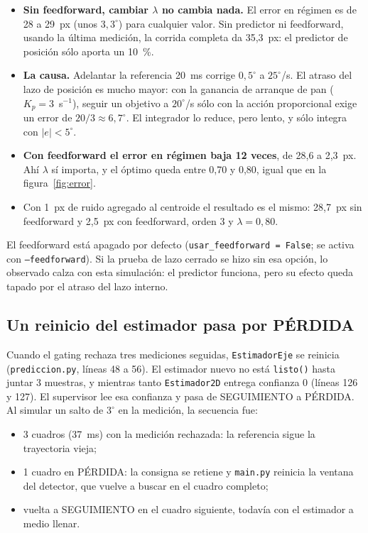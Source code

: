 \documentclass[11pt,a4paper]{article}
\newcommand{\cod}[1]{\texttt{#1}}
\newcommand{\lam}{\lambda}
\newcommand{\gr}{^{\circ}}
\begin{document}
\begin{itemize}
  \item \textbf{Sin feedforward, cambiar $\lam$ no cambia nada.} El error en régimen es de 28 a 29~px (unos
        $3{,}3\gr$) para cualquier valor. Sin predictor ni feedforward, usando la última medición, la corrida
        completa da 35,3~px: el predictor de posición sólo aporta un 10~\%.
  \item \textbf{La causa.} Adelantar la referencia 20~ms corrige $0{,}5\gr$ a $25\gr$/s. El atraso del lazo de
        posición es mucho mayor: con la ganancia de arranque de pan ($K_p = 3$~s$^{-1}$), seguir un objetivo a
        $20\gr$/s sólo con la acción proporcional exige un error de $20/3 \approx 6{,}7\gr$. El integrador lo
        reduce, pero lento, y sólo integra con $|e| < 5\gr$.
  \item \textbf{Con feedforward el error en régimen baja 12 veces}, de 28,6 a 2,3~px. Ahí $\lam$ sí importa,
        y el óptimo queda entre 0,70 y 0,80, igual que en la figura~\ref{fig:error}.
  \item Con 1~px de ruido agregado al centroide el resultado es el mismo: 28,7~px sin feedforward y 2,5~px con
        feedforward, orden 3 y $\lam = 0{,}80$.
\end{itemize}

El feedforward está apagado por defecto (\cod{usar\_feedforward = False}; se activa con \cod{--feedforward}).
Si la prueba de lazo cerrado se hizo sin esa opción, lo observado calza con esta simulación: el predictor
funciona, pero su efecto queda tapado por el atraso del lazo interno.

\subsection{Un reinicio del estimador pasa por PÉRDIDA}

Cuando el gating rechaza tres mediciones seguidas, \cod{EstimadorEje} se reinicia (\cod{prediccion.py}, líneas
48 a 56). El estimador nuevo no está \cod{listo()} hasta juntar 3 muestras, y mientras tanto
\cod{Estimador2D} entrega confianza 0 (líneas 126 y 127). El supervisor lee esa confianza y pasa de
SEGUIMIENTO a PÉRDIDA. Al simular un salto de $3\gr$ en la medición, la secuencia fue:

\begin{itemize}
  \item 3 cuadros (37~ms) con la medición rechazada: la referencia sigue la trayectoria vieja;
  \item 1 cuadro en PÉRDIDA: la consigna se retiene y \cod{main.py} reinicia la ventana del detector, que
        vuelve a buscar en el cuadro completo;
  \item vuelta a SEGUIMIENTO en el cuadro siguiente, todavía con el estimador a medio llenar.
\end{itemize}
\end{document}
